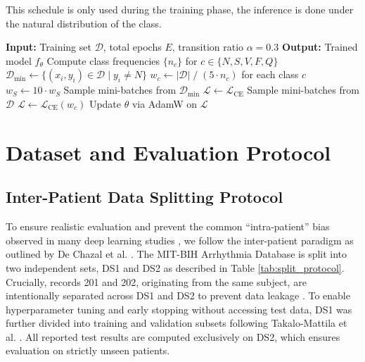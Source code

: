 \documentclass[journal,twoside,web]{ieeecolor}
\begin{document}
\noindent This schedule is only used during the training phase, the inference is done under the natural distribution of the class.

\begin{algorithm}[!t]
\caption{Minority-First Curriculum Learning Schedule}
\label{alg:curriculum}
\begin{algorithmic}[1]
\STATE \textbf{Input:} Training set $\mathcal{D}$, total epochs $E$, transition ratio $\alpha = 0.3$
\STATE \textbf{Output:} Trained model $f_\theta$
\STATE Compute class frequencies $\{n_c\}$ for $c \in \{N, S, V, F, Q\}$
\STATE $\mathcal{D}_{\text{min}} \gets \{(x_i, y_i) \in \mathcal{D} \mid y_i \neq N\}$ 
\STATE $w_c \gets |\mathcal{D}| \;/\; (5 \cdot n_c)$ for each class $c$ 
\STATE $w_S \gets 10 \cdot w_S$ 
\STATE Sample mini-batches from $\mathcal{D}_{\text{min}}$ 
\STATE $\mathcal{L} \gets \mathcal{L}_{\text{CE}}$ 
\ELSE
\STATE Sample mini-batches from $\mathcal{D}$ 
\STATE $\mathcal{L} \gets \mathcal{L}_{\text{CE}}(w_c)$ 
\ENDIF
\STATE Update $\theta$ via AdamW on $\mathcal{L}$
\ENDFOR
\end{algorithmic}
\end{algorithm}

\section{Dataset and Evaluation Protocol}

\subsection{Inter-Patient Data Splitting Protocol}
To ensure realistic evaluation and prevent the common ``intra-patient'' bias observed in many deep learning studies \cite{bahrami_investigation_2025, xiao_deep_2023}, we follow the inter-patient paradigm as outlined by De Chazal et al. \cite{chazal_automatic_2004}. The MIT-BIH Arrhythmia Database is split into two independent sets, DS1 and DS2 as described in Table \ref{tab:split_protocol}. Crucially, records 201 and 202, originating from the same subject, are intentionally separated across DS1 and DS2 to prevent data leakage \cite{xiao_deep_2023}. To enable hyperparameter tuning and early stopping without accessing test data, DS1 was further divided into training and validation subsets following Takalo-Mattila et al. \cite{takalo-mattila_inter-patient_2018}. All reported test results are computed exclusively on DS2, which ensures evaluation on strictly unseen patients.
\end{document}
